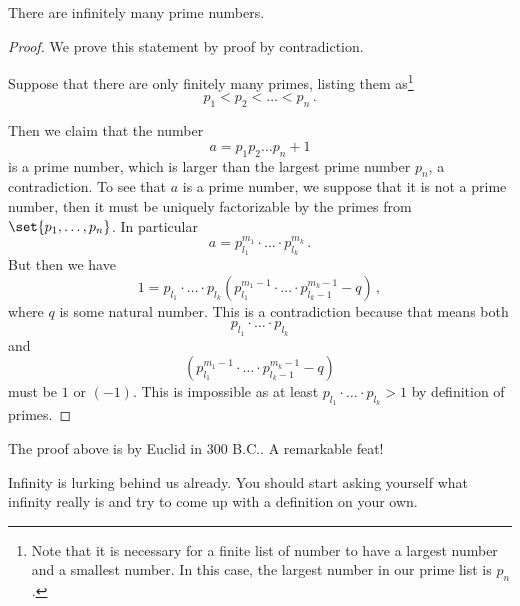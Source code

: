 \begin{theorem}
    There are infinitely many prime numbers.
\end{theorem}
\begin{proof}
    We prove this statement by proof by contradiction. 
    
    Suppose that there are only finitely many primes, listing them as\footnote{
    Note that it is necessary for a finite list of number to have a largest number and a
    smallest number.
    In this case, the largest number in our prime list is $p_n$.
    }
    \begin{equation*}
        p_1 < p_2 < \dots < p_n \,.
    \end{equation*}
    

    Then we claim that the number 
    \begin{equation*}
        a = p_1p_2 \dots p_n + 1 
    \end{equation*}
    is a prime number, which is larger than the largest prime number $p_n$, a contradiction.
    To see that $a$ is a prime number, we suppose that it is not a prime number, then 
    it must be uniquely factorizable by  the primes from $\set{p_1,\dots, p_n}$.
    In particular
    \begin{equation*}
        a = p_{l_1}^{m_1} \cdot \dots \cdot p_{l_k}^{m_k} \,.
    \end{equation*}
    But then we have 
    \begin{equation*}
        1 = p_{l_1}\cdot \dots \cdot p_{l_k} 
        ( p_{l_1}^{m_1-1} \cdot \dots \cdot p_{l_k-1}^{m_k-1} - q ) \,,
    \end{equation*}
    where $q$ is some natural number.
    This is a contradiction because that means both
   \begin{equation*}
       p_{l_1}\cdot \dots \cdot p_{l_k}
   \end{equation*} 
   and 
   \begin{equation*}
       ( p_{l_1}^{m_1-1} \cdot \dots \cdot p_{l_k-1}^{m_k-1} - q )
   \end{equation*}
   must be $1$ or $(-1)$.
   This is impossible as at least
   $ p_{l_1}\cdot \dots \cdot p_{l_k} > 1$ by definition of primes.
\end{proof}

\begin{remark}
   The proof above is by Euclid in 300 B.C.. A remarkable feat! 
\end{remark}

\begin{exercise}
    Infinity is lurking behind us already. You should start asking yourself what
    infinity really is and try to come up with a definition on your own.
\end{exercise}
